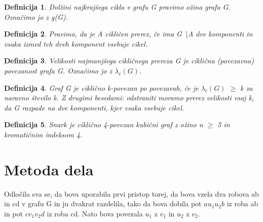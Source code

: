 \documentclass[a4paper,12pt]{article}
\newtheorem{definicija}{Definicija}
\begin{document}
	\begin{definicija}
		Dolžini najkrajšega cikla v grafu G pravimo ožina grafa G. Označimo jo z g(G).
	\end{definicija}
	\begin{definicija}
		Pravimo, da je A cikličen prerez, če ima G \textbackslash A dve komponenti in vsaka izmed teh dveh komponent vsebuje cikel.
	\end{definicija}
	
	\begin{definicija}
		Velikosti najmanjšega cikličnega prereza G je ciklična (povezavna) povezanost grafa G. Označimo jo z $\lambda_c(G)$.
	\end{definicija}
	
	\begin{definicija}
		Graf G je ciklično k-povezan po povezavah, če je $\lambda_c(G)$ $\geq$ k za
		naravno število k. Z drugimi besedami: odstraniti moramo prerez velikosti vsaj k,
		da G razpade na dve komponenti, kjer vsaka vsebuje cikel.
	\end{definicija}
	
	\begin{definicija}
		Snark je ciklično 4-povezan kubični graf z ožino n $\geq$ 5 in kromatičnim indeksom 4.
	\end{definicija}
	
	\section{Metoda dela}
	Odločila sva se, da bova uporabila prvi pristop torej, da bova vzela dva robova ab in cd v grafu G in ju dvakrat razdelila, tako da bova dobila pot $au_1u_2b$ iz roba ab in pot $cv_1v_2d$ iz roba cd. Nato bova povezala $u_1$ z $v_1$ in $u_2$ z $v_2$.
\end{document}
